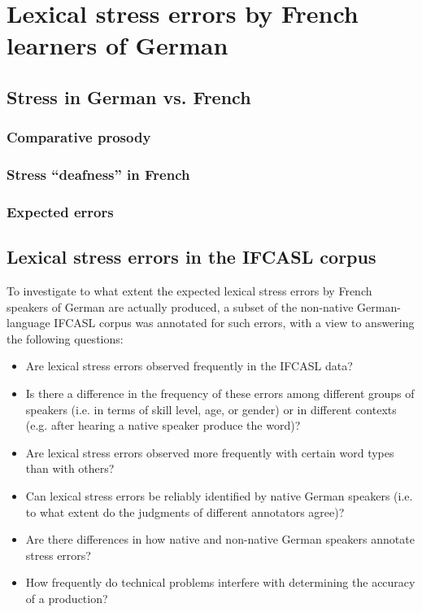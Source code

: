 %
%

\chapter{Lexical stress errors by French learners of German}



\section{Stress in German vs. French }
	\subsection{Comparative prosody}
	\subsection{Stress ``deafness'' in French}
	\subsection{Expected errors}
	
	
	
\section{Lexical stress errors in the IFCASL corpus} 

	To investigate to what extent the expected lexical stress errors by French speakers of German are actually produced, a subset of the non-native German-language IFCASL corpus was annotated for such errors, with a view to answering the following questions:

	\begin{itemize}
	\item{Are lexical stress errors observed frequently in the IFCASL data?}
	\item{Is there a difference in the frequency of these errors among different groups of speakers (i.e. in terms of skill level, age, or gender) or in different contexts (e.g. after hearing a native speaker produce the word)?}
	\item{Are lexical stress errors observed more frequently with certain word types than with others?}
	\item{Can lexical stress errors be reliably identified by native German speakers (i.e. to what extent do the judgments of different annotators agree)?}
	\item{Are there differences in how native and non-native German speakers annotate stress errors?}
	\item{How frequently do technical problems interfere with determining the accuracy of a production?}
	\end{itemize}
	
